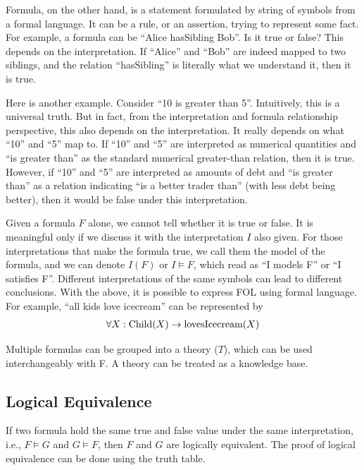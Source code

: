 Formula, on the other hand, is a statement formulated by string of symbols from a formal language. It can be a rule, or an assertion, trying to represent some fact. For example, a formula can be ``Alice hasSibling Bob''. Is it true or false? This depends on the interpretation. If ``Alice'' and ``Bob'' are indeed mapped to two siblings, and the relation ``hasSibling'' is literally what we understand it, then it is true. 

Here is another example. Consider ``10 is greater than 5''. Intuitively, this is a universal truth. But in fact, from the interpretation and formula relationship perspective, this also depends on the interpretation. It really depends on what ``10'' and ``5'' map to. If ``10'' and ``5'' are interpreted as numerical quantities and ``is greater than'' as the standard numerical greater-than relation, then it is true. However, if ``10'' and ``5'' are interpreted as amounts of debt and ``is greater than'' as a relation indicating ``is a better trader than'' (with less debt being better), then it would be false under this interpretation.

Given a formula $F$ alone, we cannot tell whether it is true or false. It is meaningful only if we discuss it with the interpretation $I$ also given. For those interpretations that make the formula true, we call them the model of the formula, and we can denote $I(F)$ or $I \vDash F$, which read as ``I models F'' or ``I satisfies F''. Different interpretations of the same symbols can lead to different conclusions. With the above, it is possible to express FOL using formal language. For example, ``all kids love icecream'' can be represented by
\begin{eqnarray}
  \forall X: \textup{Child}(X) \rightarrow \textup{lovesIcecream}(X) \nonumber
\end{eqnarray}

Multiple formulas can be grouped into a theory ($T$), which can be used interchangeably with F. A theory can be treated as a knowledge base.

\subsection{Logical Equivalence}

If two formula hold the same true and false value under the same interpretation, i.e., $F \vDash G$ and $G \vDash F$, then $F$ and $G$ are logically equivalent. The proof of logical equivalence can be done using the truth table.

